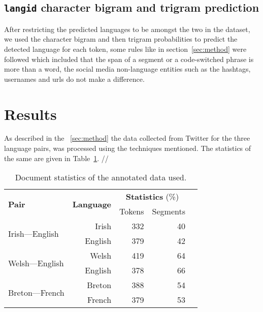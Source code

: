 \documentclass[11pt]{article}
\begin{document}
\subsection{\texttt{langid} character bigram and trigram prediction}
\label{langidstuff}

After restricting the predicted languages to be amongst the two in the dataset, we used the character bigram and then trigram probabilities to predict the detected language for each token, some rules like in section~\ref{sec:method} were followed which included that the span of a segment or a code-switched phrase is more than a word, the social media non-language entities such as the hashtags, usernames and urls do not make a difference. 

\section{Results}
\label{sec:results}
As described in the ~\ref{sec:method} the data collected from Twitter for the three language pairs, was processed using the techniques mentioned. The statistics of the same are given in Table~\ref{table:datastats}. // 

\begin{table}
\begin{center}
\begin{tabular}{|l|r|r|r|r}
\hline
\multirow{2}{*}{\textbf{Pair}} & \multirow{2}{*}{\textbf{Language}}  & \multicolumn{2}{c|}{\textbf{Statistics} (\%)} \\\cline{3-4}
                &  &  Tokens & Segments \\
\hline
\multirow{2}{*}{Irish---English} & Irish & 332 & 40 \\
                                 & English & 379 & 42 \\
\hline
\multirow{2}{*}{Welsh---English} & Welsh & 419 & 64 \\
                                 & English & 378 & 66  \\
\hline
\multirow{2}{*}{Breton---French} & Breton & 388 & 54 \\
                                 & French & 379 & 53  \\
\hline
\end{tabular}
\end{center}
\caption{Document statistics of the annotated data used. }
\label{table:datastats}
\end{table}
\end{document}
